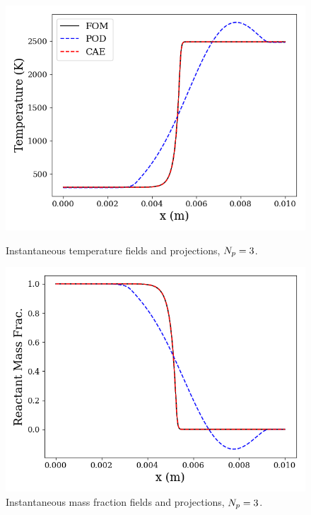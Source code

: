 \begin{figure}
    \begin{minipage}{0.45\linewidth}
        \includegraphics[width=0.99\linewidth]{Chapters/ProjROMs/Images/temp_proj_field.png}
        \caption{\label{fig:projErrTempField}Instantaneous temperature fields and projections, $N_p = 3$.}
    \end{minipage}
    \hspace{1em}
    \begin{minipage}{0.45\linewidth}
        \includegraphics[width=0.99\linewidth]{Chapters/ProjROMs/Images/mf_proj_field.png}
        \caption{\label{fig:projErrMFField}Instantaneous mass fraction fields and projections, $N_p = 3$.}
    \end{minipage}
\end{figure}
